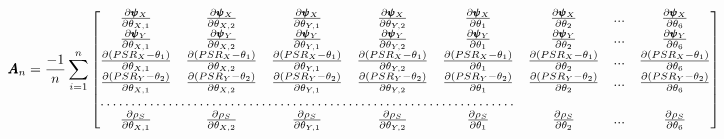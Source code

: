 \documentclass[]{article}
\begin{document}
\[
\pmb{A}_n = \frac{-1}{n}\sum_{i = 1}^{n} \begin{bmatrix}
    \frac{\partial \pmb{\psi}_X}{\partial \theta_{X,1}} & \frac{\partial \pmb{\psi}_X}{\partial \theta_{X,2}}  &  \frac{\partial \pmb{\psi}_X}{\partial \theta_{Y,1}}  &  \frac{\partial \pmb{\psi}_X}{\partial \theta_{Y,2}}     &      \frac{\partial \pmb{\psi}_X}{\partial \theta_1}     &     \frac{\partial \pmb{\psi}_X}{\partial \theta_2}     & ...   &     \frac{\partial \pmb{\psi}_X}{\partial \theta_6} \\
   \frac{\partial \pmb{\psi}_Y}{\partial \theta_{X,1}} & \frac{\partial \pmb{\psi}_Y}{\partial \theta_{X,2}}  &  \frac{\partial \pmb{\psi}_Y}{\partial \theta_{Y,1}}  &  \frac{\partial \pmb{\psi}_Y}{\partial \theta_{Y,2}}     &      \frac{\partial \pmb{\psi}_Y}{\partial \theta_1}     &     \frac{\partial \pmb{\psi}_Y}{\partial \theta_2}     &    ...   &     \frac{\partial \pmb{\psi}_Y}{\partial \theta_6} \\
    \frac{\partial (PSR_X - \theta_1)}{\partial \theta_{X,1}} & \frac{\partial (PSR_X - \theta_1)}{\partial \theta_{X,2}}  &  \frac{\partial (PSR_X - \theta_1)}{\partial \theta_{Y,1}}  &  \frac{\partial (PSR_X - \theta_1)}{\partial \theta_{Y,2}}      &      \frac{\partial (PSR_X - \theta_1)}{\partial \theta_1}     &     \frac{\partial (PSR_X - \theta_1)}{\partial \theta_2}     &    ...  &     \frac{\partial (PSR_X - \theta_1)}{\partial \theta_6} \\
   \frac{\partial (PSR_Y - \theta_2)}{\partial \theta_{X,1}} & \frac{\partial (PSR_Y - \theta_2)}{\partial \theta_{X,2}}  &  \frac{\partial (PSR_Y - \theta_2)}{\partial \theta_{Y,1}}  &  \frac{\partial (PSR_Y - \theta_2)}{\partial \theta_{Y,2}}     &      \frac{\partial  (PSR_Y - \theta_2)}{\partial \theta_1}     &     \frac{\partial  (PSR_Y - \theta_2)}{\partial \theta_2}     &     ...   &     \frac{\partial  (PSR_Y - \theta_2)}{\partial \theta_6} \\
  \hdotsfor{5} \\
  \frac{\partial \rho_S}{\partial \theta_{X,1}} & \frac{\partial \rho_S}{\partial \theta_{X,2}}  &  \frac{\partial \rho_S}{\partial \theta_{Y,1}}  &  \frac{\partial \rho_S}{\partial \theta_{Y,2}}     &      \frac{\partial \rho_S}{\partial \theta_1}     &     \frac{\partial \rho_S}{\partial \theta_2}      &     ...    &     \frac{\partial \rho_S}{\partial \theta_6} \\
\end{bmatrix}
\]
\end{document}
